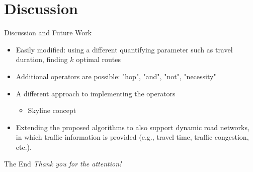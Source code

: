 \documentclass[18pt]{beamer}
\begin{document}
\section{Discussion}
	\begin{frame}{Discussion and Future Work}
	
		\begin{itemize}
			\item Easily modified: using a different quantifying parameter such as travel duration, finding $k$ optimal routes
			\item Additional operators are possible: "hop", "and", "not", "necessity"
			\item A different approach to implementing the operators
				\begin{itemize}
					\item Skyline concept \cite{skyline}
				\end{itemize}
			\item Extending the proposed algorithms to also support dynamic road networks, in which traffic information is provided (e.g., travel time, traffic congestion, etc.). \cite{dynamic}
		\end{itemize}
	
	\end{frame}

	\begin{frame}{The End}
		\centering \Large
		\emph{\textcolor{kit}{Thank you for the attention!}}
	\end{frame}


%		
%		
%		
\end{document}
